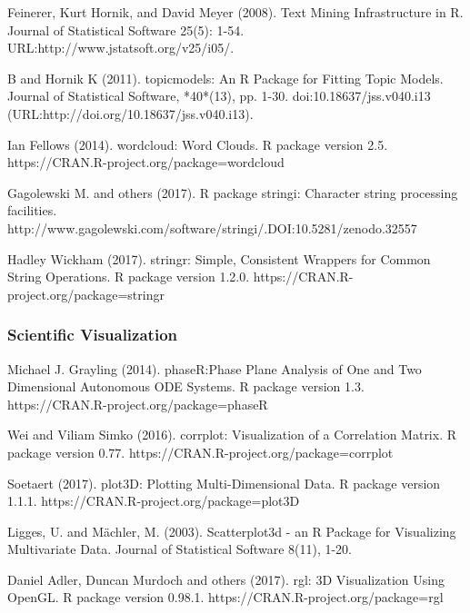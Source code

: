 \documentclass[preprint, 8pt]{elsarticle}
\theoremstyle{definition}
\begin{document}
\begin{thebibliography}{00}
  Feinerer, Kurt Hornik, and David Meyer (2008). 
\newblock Text Mining Infrastructure in R. 
\newblock Journal of Statistical Software 25(5): 1-54. URL:http://www.jstatsoft.org/v25/i05/.

 B and Hornik K (2011).
\newblock topicmodels: An R Package for Fitting Topic Models.
\newblock Journal of Statistical Software, *40*(13), pp. 1-30. doi:10.18637/jss.v040.i13 (URL:http://doi.org/10.18637/jss.v040.i13).

 Ian Fellows (2014). 
\newblock wordcloud: Word Clouds. R package version 2.5.
\newblock https://CRAN.R-project.org/package=wordcloud

 Gagolewski M. and others (2017). 
\newblock R package stringi: Character string processing facilities. 
\newblock http://www.gagolewski.com/software/stringi/.DOI:10.5281/zenodo.32557

 Hadley Wickham (2017).
\newblock stringr: Simple, Consistent Wrappers for Common String Operations. 
\newblock R package version 1.2.0. https://CRAN.R-project.org/package=stringr

\subsubsection{Scientific Visualization}

Michael J. Grayling (2014). 
\newblock phaseR:Phase Plane Analysis of One and Two Dimensional Autonomous ODE Systems. 
\newblock R package version 1.3. https://CRAN.R-project.org/package=phaseR

 Wei and Viliam Simko (2016).
\newblock corrplot: Visualization of a Correlation Matrix. 
\newblock R package version 0.77. https://CRAN.R-project.org/package=corrplot

 Soetaert (2017). 
\newblock plot3D: Plotting Multi-Dimensional Data. 
\newblock R package version 1.1.1. https://CRAN.R-project.org/package=plot3D

 Ligges, U. and Mächler, M. (2003).
\newblock Scatterplot3d - an R Package for Visualizing Multivariate Data.
\newblock Journal of Statistical Software 8(11), 1-20.

Daniel Adler, Duncan Murdoch and others (2017). 
\newblock rgl: 3D Visualization Using OpenGL. 
\newblock R package version 0.98.1. https://CRAN.R-project.org/package=rgl


\end{thebibliography}
\end{document}
